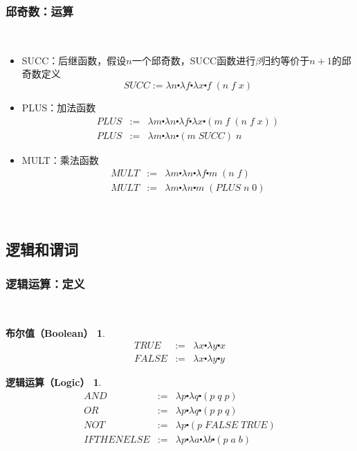 \documentclass[CJK,compress,hyperref]{beamer}
\begin{document}
\begin{CJK}{UTF8}{song}
\begin{frame}
  \frametitle{邱奇数：运算}　　
  \begin{itemize}
  \item SUCC：后继函数，假设$n$一个邱奇数，SUCC函数进行$\beta$归约等价于$n + 1$的邱奇数定义
    \begin{equation*}
      SUCC := \lambda n \centerdot \lambda f \centerdot \lambda x \centerdot f \; (n \; f \; x) 
    \end{equation*}
  \item PLUS：加法函数
    \begin{eqnarray*}
      PLUS & := & \lambda m \centerdot \lambda n \centerdot \lambda f \centerdot \lambda x \centerdot (m \; f \;(n \;f \; x)) \\ 
      PLUS & := & \lambda m \centerdot \lambda n \centerdot (m \; SUCC) \; n  
    \end{eqnarray*}
  \item MULT：乘法函数　
    \begin{eqnarray*}
      MULT & := & \lambda m \centerdot \lambda n \centerdot \lambda f \centerdot m \; (n \; f) \\ 
      MULT & := & \lambda m \centerdot \lambda n \centerdot m \; (PLUS \; n \;0)  
    \end{eqnarray*}
  \end{itemize}　
\end{frame}

\subsection{逻辑和谓词}
\begin{frame}
  \frametitle{逻辑运算：定义}　
  \newtheorem{boolV}{布尔值（Boolean）}
  \begin{boolV}
    \begin{eqnarray*}
      TRUE  & := & \lambda x \centerdot \lambda y \centerdot x \\
      FALSE & := & \lambda x \centerdot \lambda y \centerdot y 
    \end{eqnarray*} 
  \end{boolV}
  \newtheorem{logicO}{逻辑运算（Logic）} 
  \begin{logicO}
    \begin{eqnarray*}
      AND & := & \lambda p \centerdot \lambda q \centerdot (p \; q \; p) \\
      OR & := & \lambda p \centerdot \lambda q \centerdot (p \; p \; q) \\
      NOT & := & \lambda p \centerdot (p \; FALSE \; TRUE) \\
      IFTHENELSE & := & \lambda p \centerdot \lambda a \centerdot \lambda b \centerdot (p \; a \; b)
    \end{eqnarray*}
  \end{logicO}
\end{frame}


\end{CJK}
\end{document}
